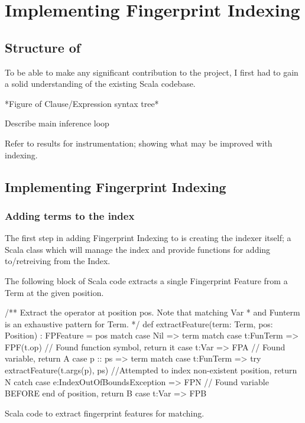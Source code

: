 
\chapter{Implementing Fingerprint Indexing}
\label{cha:method}

\section{Structure of \beagle}
\label{sec:initial}

To be able to make any significant contribution to the \beagle  project, I first
had to gain a solid understanding of the existing Scala codebase.

*Figure of Clause/Expression syntax tree*

Describe main inference loop

Refer to results for instrumentation; showing what may be improved with indexing.

\section{Implementing Fingerprint Indexing}
\label{sec:initial}

\subsection{Adding terms to the index}

The first step in adding Fingerprint Indexing to \beagle is creating the indexer
itself; a Scala class which will manage the index and provide functions for adding
to/retreiving from the Index. 


The following block of Scala code extracts a single Fingerprint Feature from
a Term at the given position.
\begin{listing}[H]
\begin{scalacode}
 /** Extract the operator at position pos. Note that matching Var
   * and Funterm is an exhaustive pattern for Term. */
  def extractFeature(term: Term, pos: Position) : FPFeature = pos match {
    case Nil     => term match {
      case t:FunTerm => FPF(t.op) // Found function symbol, return it
      case t:Var     => FPA       // Found variable, return A
    }
    case p :: ps => term match {
      case t:FunTerm => try   {extractFeature(t.args(p), ps) }
                        //Attempted to index non-existent position, return N
                        catch {case e:IndexOutOfBoundsException => FPN}
      // Found variable BEFORE end of position, return B
      case t:Var     => FPB 
    }
  }
\end{scalacode}
\caption{Scala code to extract fingerprint features for matching.}
\label{lst:posextract}
\end{listing}


